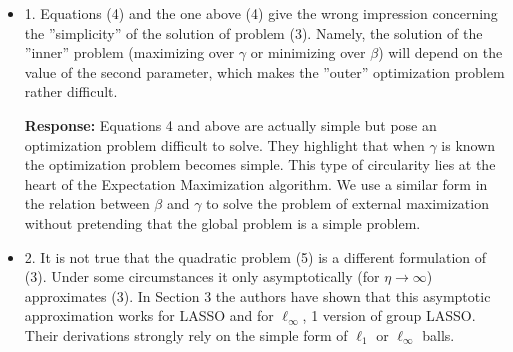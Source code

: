 \documentclass[a4paper,11pt]{texMemo}
\newenvironment{comment}
{
   \par\medskip \color{black}%
   \textbf{Response: }}
{\medskip}
\newenvironment{remark}
{\begin{itshape} \color{gray}}
{\end{itshape}}
\begin{document}
\begin{itemize}

\item 
  \begin{remark}
    1. Equations (4) and the one above (4) give the wrong impression
  concerning the ''simplicity'' of the solution of problem (3).  Namely,
  the solution of the ''inner'' problem (maximizing over $\gamma$ or minimizing
  over $\beta$) will depend on the value of the second parameter, which
  makes the ''outer'' optimization problem rather difficult.
   \end{remark}

   \begin{comment}
     Equations 4 and above are actually simple but pose an
     optimization problem difficult to solve. They highlight that when
     $\gamma$ is known the optimization problem becomes simple. This
     type of circularity lies at the heart of the Expectation
     Maximization algorithm. We use a similar form in the relation
     between $\beta$ and $\gamma$ to solve the problem of external
     maximization without pretending that the global problem is a
     simple problem.
\end{comment}






\item
  \begin{remark}
    2.  It is not true that the quadratic problem (5) is a different
    formulation of (3).  Under some circumstances it only
    asymptotically (for $\eta \rightarrow \infty$) approximates (3).
    In Section 3 the authors have shown that this asymptotic
    approximation works for LASSO and for $\ell_\infty$, 1 version of
    group LASSO. Their derivations strongly rely on the simple form of
    $\ell_1$ or $\ell_\infty$ balls.
   \end{remark}


\end{itemize}
\end{document}
